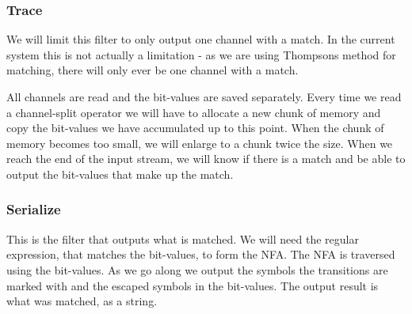 



\subsubsection{Trace}

We will limit this filter to only output one channel with a match. In
the current system this is not actually a limitation - as we are using
Thompsons method for matching, there will only ever be one channel
with a match.

All channels are read and the bit-values are saved separately. Every
time we read a channel-split operator we will have to allocate a new
chunk of memory and copy the bit-values we have accumulated up to this
point. When the chunk of memory becomes too small, we will enlarge to a
chunk twice the size. When we reach the end of the input stream, we
will know if there is a match and be able to output the bit-values
that make up the match.

\subsubsection{Serialize}
  
This is the filter that outputs what is matched. We will need the
regular expression, that matches the bit-values, to form the NFA. The
NFA is traversed using the bit-values. As we go along we output the
symbols the transitions are marked with and the escaped symbols in the
bit-values. The output result is what was matched, as a string.
